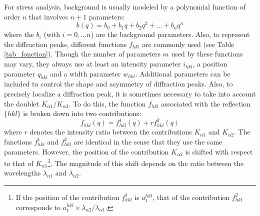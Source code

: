 \documentclass[french,a4paper]{report}
\begin{document}
For stress analysis, background is usually modeled by a polynomial function of order $n$ that involves $n+1$ parameters:
\begin{equation}
 b \left(q \right) = b_0 + b_1 q + b_2 q^2 + ...+ b_n q^n
\end{equation}
where the $b_i$ (with $i=0, ... n$) are the background parameters. Also, to represent the diffraction peaks, different functions $f_{hkl}$ are commonly used (see Table \ref{tab_fonction}). Though the number of parameters $m$ used by these functions may vary, they always use at least an intensity parameter $i_{hkl}$, a position parameter $q_{hkl}$ and a width parameter $w_{hkl}$. Additional parameters can be included to control the shape and asymmetry of diffraction peaks. Also, to precisely localize a diffraction peak, it is sometimes necessary to take into account the doublet $K_{\alpha 1} / K_{\alpha 2}$. To do this, the function $f_{hkl} $ associated with the reflection $\{ hkl \}$ is broken down into two contributions:
\begin{equation}
f_{hkl} \left(q \right) = f^1_{hkl} \left(q \right) + r f^2_{hkl} \left(q \right)
\end{equation}
where $r$ denotes the intensity ratio between the contributions $K_{\alpha 1}$ and $K_{\alpha 2}$. The functions $f^1_{hkl}$ and $f^2_{hkl}$ are identical in the sense that they use the same parameters. However, the position of the contribution $K_{\alpha 2}$ is shifted with respect to that of $K_{\alpha 1}$\footnote{If the position of the contribution $f^1_{hkl}$ is $a_1^{hkl}$, that of the contribution $f^2_{hkl}$ corresponds to $ a_1^{hkl}\times \lambda_{\alpha 2} / \lambda_{\alpha 1}$.}. The magnitude of this shift depends on the ratio between the wavelengths $\lambda_{\alpha 1}$ and $\lambda_{\alpha 2}$.
\end{document}
